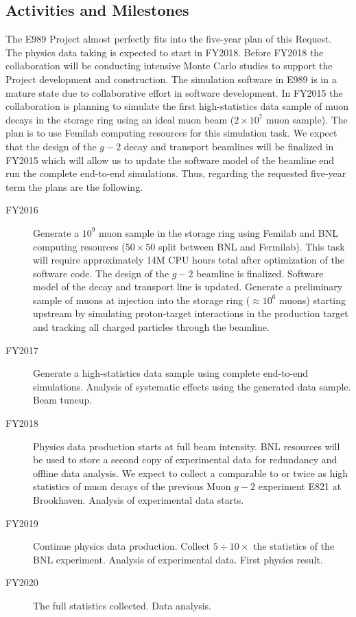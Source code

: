 \documentclass[pdftex,12pt,letter]{article}
\begin{document}
\subsection{Activities and Milestones}

The E989 Project almost perfectly fits into the five-year plan of this
Request. 
The physics data taking is expected to start in FY2018. 
Before FY2018 the collaboration will be conducting intensive Monte
Carlo studies to support the Project development and construction. 
The simulation software in E989 is in a mature state due to
collaborative effort in software development. 
In FY2015 the collaboration is planning to simulate the first
high-statistics data sample of muon decays in the storage ring using
an ideal muon beam ($2\times 10^7$ muon sample). 
The plan is to use Femilab computing resources for this simulation
task. 
We expect that the design of the $g-2$ decay and transport beamlines
will be finalized in FY2015 which will allow us to update the software
model of the beamline end run the complete end-to-end simulations. 
Thus, regarding the requested five-year term the plans are the
following. 
\begin{description}
\item[FY2016] 
Generate a $10^9$ muon sample in the storage ring using Femilab and BNL computing resources ($50\times50$ split between BNL and Fermilab).  
  This task will require approximately 14M CPU hours total after optimization of the software code. 
  The design of the $g-2$ beamline is finalized.  
  Software model of the decay and transport line is updated. 
  Generate a preliminary sample of muons at injection into the storage ring ($\approx 10^6$ muons)  starting upstream by simulating proton-target interactions in the production target and tracking all charged particles through the beamline. 
\item[FY2017] 
  Generate a high-statistics data sample using complete end-to-end simulations. 
  Analysis of systematic effects using the generated data sample. 
  Beam tuneup. 
\item[FY2018] 
  Physics data production starts at full beam intensity. 
  BNL resources will be used to store a second copy of experimental data for redundancy and offline data analysis. 
  We expect to collect a comparable to or twice as high statistics of muon decays of the previous Muon $g-2$ experiment E821 at Brookhaven. 
  Analysis of experimental data starts. 
\item[FY2019] 
  Continue physics data production. 
  Collect $5\div 10\times$ the statistics of the BNL experiment. 
  Analysis of experimental data.  
  First physics result. 
\item[FY2020]
  The full statistics collected. Data analysis.  
\end{description}
\end{document}

